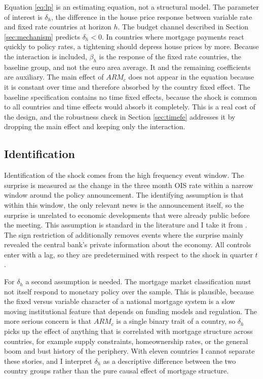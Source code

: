 Equation \eqref{eq:lp} is an estimating equation, not a structural model.
The parameter of interest is $\delta_h$, the difference in the house price
response between variable rate and fixed rate countries at horizon $h$. The
budget channel described in Section \ref{sec:mechanism} predicts
$\delta_h < 0$. In countries where mortgage payments react quickly to policy
rates, a tightening should depress house prices by more. Because the
interaction is included, $\beta_h$ is the response of the fixed rate
countries, the baseline group, and not the euro area average. It and the
remaining coefficients are auxiliary. The main effect of $ARM_c$ does not
appear in the equation because it is constant over time and therefore
absorbed by the country fixed effect. The baseline specification contains
no time fixed effects, because the shock is common to all countries and
time effects would absorb it completely. This is a real cost of the
design, and the robustness check in Section \ref{sec:timefe} addresses it
by dropping the main effect and keeping only the interaction.

\subsection{Identification}

Identification of the shock comes from the high frequency event window. The
surprise is measured as the change in the three month OIS rate within a
narrow window around the policy announcement. The identifying assumption is
that within this window, the only relevant news is the announcement itself,
so the surprise is unrelated to economic developments that were already
public before the meeting. This assumption is standard in the literature and
I take it from \citet{altavilla2019}. The sign restriction of
\citet{jarocinski2020} additionally removes events where the surprise mainly
revealed the central bank's private information about the economy. All
controls enter with a lag, so they are predetermined with respect to the
shock in quarter $t$.

For $\delta_h$ a second assumption is needed. The mortgage market
classification must not itself respond to monetary policy over the sample.
This is plausible, because the fixed versus variable character of a national
mortgage system is a slow moving institutional feature that depends on
funding models and regulation. The more serious concern is that $ARM_c$ is a single
binary trait of a country, so $\delta_h$ picks up the effect of anything
that is correlated with mortgage structure across countries, for example
supply constraints, homeownership rates, or the general boom and bust
history of the periphery. With eleven countries I cannot separate these
stories, and I interpret $\delta_h$ as a descriptive difference between the
two country groups rather than the pure causal effect of mortgage structure.

